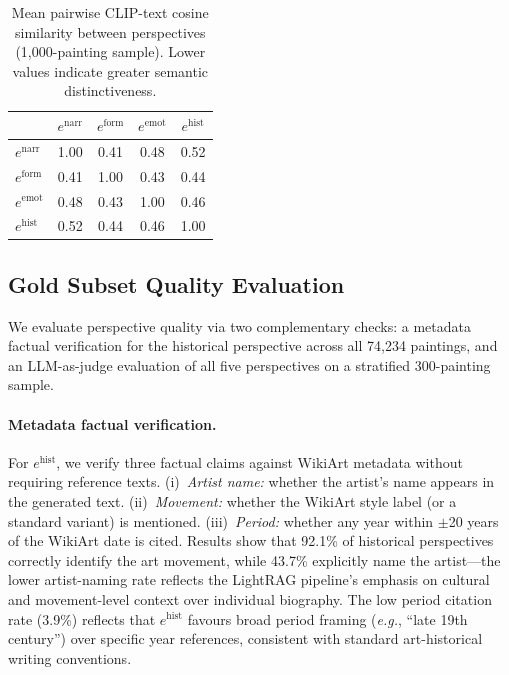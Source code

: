 \begin{table}[h]
\centering
\caption{Mean pairwise CLIP-text cosine similarity between perspectives (1{,}000-painting sample). Lower values indicate greater semantic distinctiveness.}
\label{tab:pairwise_sim}
\begin{tabular}{lcccc}
\toprule
 & $e^{\text{narr}}$ & $e^{\text{form}}$ & $e^{\text{emot}}$ & $e^{\text{hist}}$ \\
\midrule
$e^{\text{narr}}$ & 1.00 & 0.41 & 0.48 & 0.52 \\
$e^{\text{form}}$ & 0.41 & 1.00 & 0.43 & 0.44 \\
$e^{\text{emot}}$ & 0.48 & 0.43 & 1.00 & 0.46 \\
$e^{\text{hist}}$ & 0.52 & 0.44 & 0.46 & 1.00 \\
\bottomrule
\end{tabular}
\end{table}

\subsection{Gold Subset Quality Evaluation}

We evaluate perspective quality via two complementary checks: a metadata factual verification for the historical perspective across all 74,234 paintings, and an LLM-as-judge evaluation of all five perspectives on a stratified 300-painting sample.

\paragraph{Metadata factual verification.}
For $e^{\text{hist}}$, we verify three factual claims against WikiArt metadata without requiring reference texts.
(i)~\textit{Artist name:} whether the artist's name appears in the generated text.
(ii)~\textit{Movement:} whether the WikiArt style label (or a standard variant) is mentioned.
(iii)~\textit{Period:} whether any year within $\pm$20 years of the WikiArt date is cited.
Results show that 92.1\% of historical perspectives correctly identify the art movement, while 43.7\% explicitly name the artist---the lower artist-naming rate reflects the LightRAG pipeline's emphasis on cultural and movement-level context over individual biography.
The low period citation rate (3.9\%) reflects that $e^{\text{hist}}$ favours broad period framing (\emph{e.g.}, ``late 19th century'') over specific year references, consistent with standard art-historical writing conventions.

